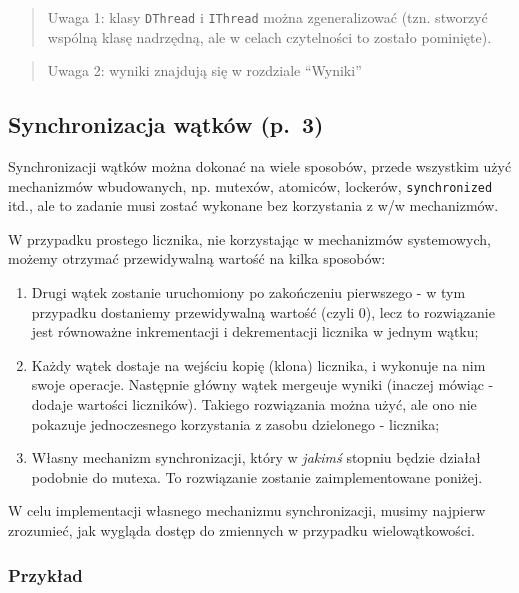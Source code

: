 \documentclass[11pt]{article}
\begin{document}
\begin{quote}
Uwaga 1: klasy \texttt{DThread} i \texttt{IThread} można zgeneralizować
(tzn. stworzyć wspólną klasę nadrzędną, ale w celach czytelności to
zostało pominięte).
\end{quote}

\begin{quote}
Uwaga 2: wyniki znajdują się w rozdziale ``Wyniki''
\end{quote}

\hypertarget{synchronizacja-wux105tkuxf3w-p.-3}{%
\subsection{Synchronizacja wątków
(p.~3)}\label{synchronizacja-wux105tkuxf3w-p.-3}}

Synchronizacji wątków można dokonać na wiele sposobów, przede wszystkim
użyć mechanizmów wbudowanych, np. mutexów, atomiców, lockerów,
\texttt{synchronized} itd., ale to zadanie musi zostać wykonane bez
korzystania z w/w mechanizmów.

W przypadku prostego licznika, nie korzystając w mechanizmów
systemowych, możemy otrzymać przewidywalną wartość na kilka sposobów:

\begin{enumerate}
\def\labelenumi{\arabic{enumi}.}
\item
  Drugi wątek zostanie uruchomiony po zakończeniu pierwszego - w tym
  przypadku dostaniemy przewidywalną wartość (czyli 0), lecz to
  rozwiązanie jest równoważne inkrementacji i dekrementacji licznika w
  jednym wątku;
\item
  Każdy wątek dostaje na wejściu kopię (klona) licznika, i wykonuje na
  nim swoje operacje. Następnie główny wątek mergeuje wyniki (inaczej
  mówiąc - dodaje wartości liczników). Takiego rozwiązania można użyć,
  ale ono nie pokazuje jednoczesnego korzystania z zasobu dzielonego -
  licznika;
\item
  Własny mechanizm synchronizacji, który w \emph{jakimś} stopniu będzie
  działał podobnie do mutexa. To rozwiązanie zostanie zaimplementowane
  poniżej.
\end{enumerate}

W celu implementacji własnego mechanizmu synchronizacji, musimy najpierw
zrozumieć, jak wygląda dostęp do zmiennych w przypadku wielowątkowości.

\hypertarget{przykux142ad}{%
\subsubsection{Przykład}\label{przykux142ad}}
\end{document}
